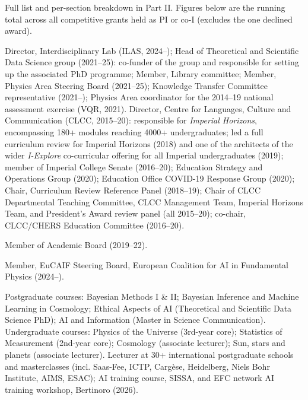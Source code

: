 
Full list and per-section breakdown in Part II. Figures below are the running total across all competitive grants held as PI or co-I (excludes the one declined award).

\grantgrandtotal



Director, Interdisciplinary Lab (ILAS, 2024–); Head of Theoretical and Scientific Data Science group (2021–25): co-funder of the group and responsible for setting up the associated PhD programme; Member, Library committee; Member, Physics Area Steering Board (2021–25); Knowledge Transfer Committee representative (2021–); Physics Area coordinator for the 2014–19 national assessment exercise (VQR, 2021).
Director, Centre for Languages, Culture and Communication (CLCC, 2015–20): responsible for {\em Imperial Horizons}, encompassing 180+ modules reaching 4000+ undergraduates; led a full curriculum review for Imperial Horizons (2018) and one of the architects of the wider {\em I-Explore} co-curricular offering for all Imperial undergraduates (2019); member of Imperial College Senate (2016–20); Education Strategy and Operations Group (2020); Education Office COVID-19 Response Group (2020); Chair, Curriculum Review Reference Panel (2018–19); Chair of CLCC Departmental Teaching Committee, CLCC Management Team, Imperial Horizons Team, and President's Award review panel (all 2015–20); co-chair, CLCC/CHERS Education Committee (2016–20).

Member of Academic Board (2019–22).

Member, EuCAIF Steering Board, European Coalition for AI in Fundamental Physics (2024–).


Postgraduate courses: Bayesian Methods I \& II; Bayesian Inference and Machine Learning in Cosmology; Ethical Aspects of AI (Theoretical and Scientific Data Science PhD); AI and Information (Master in Science Communication).
Undergraduate courses: Physics of the Universe (3rd-year core);  Statistics of Measurement (2nd-year core); Cosmology (associate lecturer); Sun, stars and planets (associate lecturer).
Lecturer at 30+ international postgraduate schools and masterclasses (incl. Saas-Fee, ICTP, Carg\`ese, Heidelberg, Niels Bohr Institute, AIMS, ESAC); AI training course, SISSA, and EFC network AI training workshop, Bertinoro (2026).

